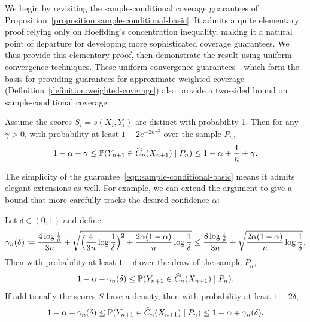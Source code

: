 \documentclass[11pt]{article}
\newcommand{\scorefunc}{s}
\newcommand{\scoreval}{\scorefunc}
\newcommand{\scorerv}{S}
\begin{document}
We begin by revisiting the sample-conditional coverage
guarantees of Proposition~\ref{proposition:sample-conditional-basic}.
%
It admits a quite elementary proof relying only on Hoeffding's
concentration inequality, making it a natural point of
departure for developing more sophisticated coverage guarantees.
%
We thus provide this elementary proof, then
demonstrate the result using uniform convergence techniques.
%
These uniform convergence guarantees---which form the basis
for providing guarantees for approximate weighted coverage
(Definition~\ref{definition:weighted-coverage}) also
provide a two-sided bound on sample-conditional coverage:
\begin{corollary}
  \label{corollary:distinct-scores}
  Assume the scores $\scorerv_i = \scoreval(X_i, Y_i)$ are distinct with
  probability 1.
  Then for any $\gamma > 0$, with probability at least
  $1 - 2 e^{-2n \gamma^2}$ over the sample $P_n$,
  \begin{equation*}
    1 - \alpha - \gamma
    \le \mathbb{P}(Y_{n + 1} \in \widehat{C}_n(X_{n + 1}) \mid P_n)
    \le 1 - \alpha + \frac{1}{n} + \gamma.
  \end{equation*}
\end{corollary}

The simplicity of the guarantee~\eqref{eqn:sample-conditional-basic}
means it admits elegant extensions as well.
%
For example, we can extend the argument to give a bound that
more carefully tracks the desired confidence $\alpha$:

\begin{proposition}
  \label{proposition:distinct-scores}
  Let $\delta \in (0, 1)$ and define
  \begin{equation*}
    \gamma_n(\delta) \coloneqq \frac{4 \log \frac{1}{\delta}}{3n}
    + \sqrt{\Big(\frac{4}{3 n} \log \frac{1}{\delta}\Big)^2 +
      \frac{2 \alpha(1 - \alpha)}{n}
      \log \frac{1}{\delta}}
    \le \frac{8 \log \frac{1}{\delta}}{3n}
    + \sqrt{\frac{2 \alpha(1 - \alpha)}{n} \log \frac{1}{\delta}}.
  \end{equation*}
  Then with probability at least $1 - \delta$
  over the draw of the sample $P_n$,
  \begin{equation*}
    1 - \alpha - \gamma_n(\delta)
    \le \mathbb{P}(Y_{n + 1} \in \widehat{C}_n(X_{n+1}) \mid P_n).
  \end{equation*}
  If additionally the scores $\scorerv$ have a density,
  then with probability at least $1 - 2 \delta$,
  \begin{equation*}
    1 - \alpha - \gamma_n(\delta)
    \le \mathbb{P}(Y_{n + 1} \in \widehat{C}_n(X_{n+1}) \mid P_n)
    \le 1 - \alpha + \gamma_n(\delta).
  \end{equation*}
\end{proposition}
\end{document}
